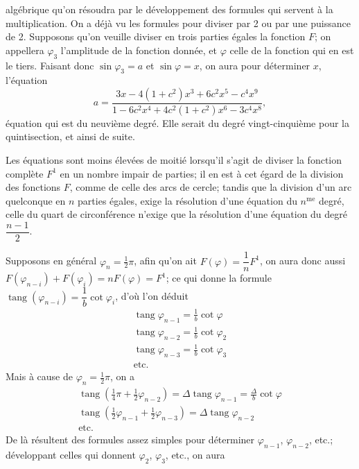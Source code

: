 \documentclass{article}
\begin{document}
algébrique qu'on résoudra par le développement des formules qui servent à la multiplication. On a déjà vu les formules pour diviser par 2 ou par une puissance de 2. Supposons qu'on veuille diviser en trois parties égales la fonction $F$; on appellera $\varphi_{3}$ l'amplitude de la fonction donnée, et $\varphi$ celle de la fonction qui en est le tiers. Faisant donc $\sin\varphi_{3}=a$ et $\sin\varphi=x$, on aura pour déterminer $x$, l'équation
\[ a=\frac{3x-4(1+c^{2})x^{3}+6c^{2}x^{5}-c^{4}x^{9}}{1-6c^{2}x^{4}+4c^{2}(1+c^{2})x^{6}-3c^{4}x^{8}}, \]
équation qui est du neuvième degré. Elle serait du degré vingt-cinquième pour la quintisection, et ainsi de suite.

Les équations sont moins élevées de moitié lorsqu'il s'agit de diviser la fonction complète $F^{1}$ en un nombre impair de parties; il en est à cet égard de la division des fonctions $F$, comme de celle des arcs de cercle; tandis que la division d'un arc quelconque en $n$ parties égales, exige la résolution d'une équation du $n^{\text{me}}$ degré, celle du quart de circonférence n'exige que la résolution d'une équation du degré $\dfrac{n-1}{2}$.

Supposons en général $\varphi_{n}=\frac{1}{2}\pi$, afin qu'on ait $F(\varphi)=\dfrac{1}{n}F^{1}$, on aura donc aussi $F(\varphi_{n-i})+F(\varphi_{i})=nF(\varphi)=F^{1}$; ce qui donne la formule $\operatorname{tang}(\varphi_{n-i})=\dfrac{1}{b}\cot\varphi_{i}$, d'où l'on déduit
\[ \begin{gathered} \operatorname{tang}\varphi_{n-1}=\frac{1}{b}\cot\varphi \\ \operatorname{tang}\varphi_{n-2}=\frac{1}{b}\cot\varphi_{2} \\ \operatorname{tang}\varphi_{n-3}=\frac{1}{b}\cot\varphi_{3} \\ \text{etc.} \end{gathered} \]
Mais à cause de $\varphi_{n}=\frac{1}{2}\pi$, on a
\[ \begin{gathered} \operatorname{tang}(\tfrac{1}{4}\pi+\tfrac{1}{2}\varphi_{n-2})=\Delta\operatorname{tang}\varphi_{n-1}=\frac{\Delta}{b}\cot\varphi \\ \operatorname{tang}(\tfrac{1}{2}\varphi_{n-1}+\tfrac{1}{2}\varphi_{n-3})=\Delta\operatorname{tang}\varphi_{n-2} \\ \text{etc.} \end{gathered} \]
De là résultent des formules assez simples pour déterminer $\varphi_{n-1}$, $\varphi_{n-2}$, etc.; développant celles qui donnent $\varphi_{2}$, $\varphi_{3}$, etc., on aura
\end{document}
